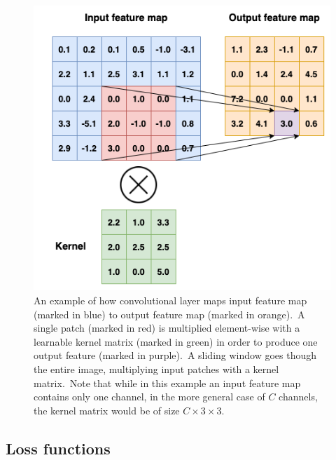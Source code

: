 \documentclass[longabstract, english, mgr]{iithesis}
\theoremstyle{default_theorem_style}\newtheorem{theorem}{Theorem}
\theoremstyle{default_theorem_style}\newtheorem{definition}{Definition}
\begin{document}
\begin{figure}[t]
\centering
\includegraphics[scale=0.48]{convolutional_network}
\caption{An example of how convolutional layer maps input feature map (marked in blue) to output feature
map (marked in orange).\ A single patch (marked in red) is multiplied element-wise with a learnable kernel matrix
(marked in green) in order to produce one output feature (marked in purple).\ A sliding window goes though the entire
image, multiplying input patches with a kernel matrix.\ Note that while in this example an input feature map contains
only one channel, in the more general case of $C$ channels, the kernel matrix would be of size $C \times 3 \times 3$.}
\label{fig:convolutional_network}
\end{figure}

\subsection{Loss functions}
\end{document}
